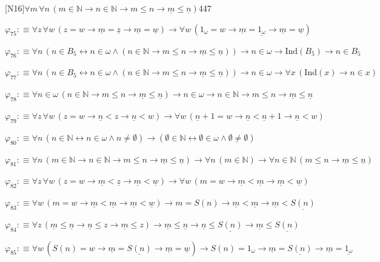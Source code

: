 \begin{fullproof}{[N16]}{$\forall m\,\forall n\,(m \in \mathbb{N} \to n \in \mathbb{N} \to m \leq n \to \underline{m} \leq \underline{n})$}{447}
\begin{abbrevlist}
\item $\varphi_{75} :\equiv \forall z\,\forall w\,(z = w \to \underline{m} = \underline{z} \to \underline{m} = \underline{w}) \to \forall w\,(1_{\omega} = w \to \underline{m} = \underline{1_{\omega}} \to \underline{m} = \underline{w})$
\item $\varphi_{76} :\equiv \forall n\,(n \in B_{5} \leftrightarrow n \in \omega \land (n \in \mathbb{N} \to m \leq n \to \underline{m} \leq \underline{n})) \to n \in \omega \to \mathrm{Ind}(B_{5}) \to n \in B_{5}$
\item $\varphi_{77} :\equiv \forall n\,(n \in B_{5} \leftrightarrow n \in \omega \land (n \in \mathbb{N} \to m \leq n \to \underline{m} \leq \underline{n})) \to n \in \omega \to \forall x\,(\mathrm{Ind}(x) \to n \in x)$
\item $\varphi_{78} :\equiv \forall n \in \omega\,(n \in \mathbb{N} \to m \leq n \to \underline{m} \leq \underline{n}) \to n \in \omega \to n \in \mathbb{N} \to m \leq n \to \underline{m} \leq \underline{n}$
\item $\varphi_{79} :\equiv \forall z\,\forall w\,(z = w \to \underline{n} < z \to \underline{n} < w) \to \forall w\,(\underline{n} + 1 = w \to \underline{n} < \underline{n} + 1 \to \underline{n} < w)$
\item $\varphi_{80} :\equiv \forall n\,(n \in \mathbb{N} \leftrightarrow n \in \omega \land n \neq \emptyset) \to (\emptyset \in \mathbb{N} \leftrightarrow \emptyset \in \omega \land \emptyset \neq \emptyset)$
\item $\varphi_{81} :\equiv \forall n\,(m \in \mathbb{N} \to n \in \mathbb{N} \to m \leq n \to \underline{m} \leq \underline{n}) \to \forall n\,(m \in \mathbb{N}) \to \forall n \in \mathbb{N}\,(m \leq n \to \underline{m} \leq \underline{n})$
\item $\varphi_{82} :\equiv \forall z\,\forall w\,(z = w \to \underline{m} < \underline{z} \to \underline{m} < \underline{w}) \to \forall w\,(m = w \to \underline{m} < \underline{m} \to \underline{m} < \underline{w})$
\item $\varphi_{83} :\equiv \forall w\,(m = w \to \underline{m} < \underline{m} \to \underline{m} < \underline{w}) \to m = S(n) \to \underline{m} < \underline{m} \to \underline{m} < \underline{S(n)}$
\item $\varphi_{84} :\equiv \forall z\,(\underline{m} \leq \underline{n} \to \underline{n} \leq z \to \underline{m} \leq z) \to \underline{m} \leq \underline{n} \to \underline{n} \leq \underline{S(n)} \to \underline{m} \leq \underline{S(n)}$
\item $\varphi_{85} :\equiv \forall w\,(S(n) = w \to \underline{m} = \underline{S(n)} \to \underline{m} = \underline{w}) \to S(n) = 1_{\omega} \to \underline{m} = \underline{S(n)} \to \underline{m} = \underline{1_{\omega}}$

\end{abbrevlist}
\end{fullproof}
